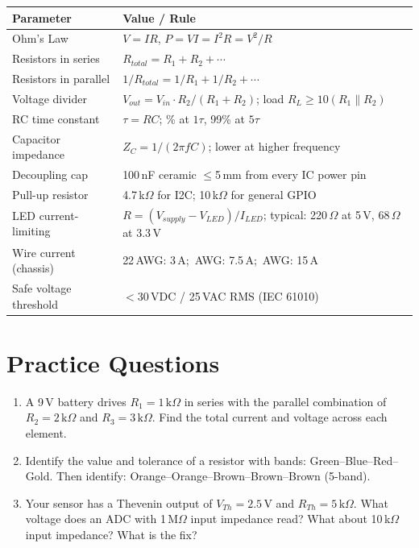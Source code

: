 \begin{quickrefbox}
\begin{table}[H]\centering\small
\begin{tabularx}{\linewidth}{l X}
\toprule
\textbf{Parameter} & \textbf{Value / Rule} \\
\midrule
Ohm's Law & $V = IR$, \; $P = VI = I^2R = V^2/R$ \\
Resistors in series & $R_{total} = R_1 + R_2 + \cdots$ \\
Resistors in parallel & $1/R_{total} = 1/R_1 + 1/R_2 + \cdots$ \\
Voltage divider & $V_{out} = V_{in} \cdot R_2/(R_1 + R_2)$; \; load $R_L \geq 10(R_1 \| R_2)$ \\
RC time constant & $\tau = RC$; \; 63\% at $1\tau$, 99\% at $5\tau$ \\
Capacitor impedance & $Z_C = 1/(2\pi f C)$; \; lower at higher frequency \\
Decoupling cap & 100\,nF ceramic $\leq$5\,mm from every IC power pin \\
Pull-up resistor & 4.7\,k$\Omega$ for I2C; 10\,k$\Omega$ for general GPIO \\
LED current-limiting & $R = (V_{supply} - V_{LED})/I_{LED}$; \; typical: 220\,$\Omega$ at 5\,V, 68\,$\Omega$ at 3.3\,V \\
Wire current (chassis) & 22\,AWG: 3\,A; \; 18\,AWG: 7.5\,A; \; 14\,AWG: 15\,A \\
Safe voltage threshold & $<$30\,VDC / 25\,VAC RMS (IEC 61010) \\
\bottomrule
\end{tabularx}
\end{table}
\end{quickrefbox}

\section{Practice Questions}
\begin{enumerate}[leftmargin=1.5em]
\item A 9\,V battery drives $R_1 = 1\,\text{k}\Omega$ in series with the parallel combination of $R_2 = 2\,\text{k}\Omega$ and $R_3 = 3\,\text{k}\Omega$. Find the total current and voltage across each element.
\item Identify the value and tolerance of a resistor with bands: Green--Blue--Red--Gold. Then identify: Orange--Orange--Brown--Brown--Brown (5-band).
\item Your sensor has a Thevenin output of $V_{Th} = 2.5$\,V and $R_{Th} = 5\,\text{k}\Omega$. What voltage does an ADC with 1\,M$\Omega$ input impedance read? What about 10\,k$\Omega$ input impedance? What is the fix?
\end{enumerate}

